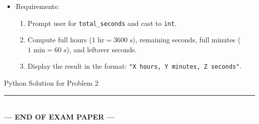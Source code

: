 \documentclass[11pt,a4paper]{article}
\begin{document}
\begin{itemize}[noitemsep]

  \item Requirements:

  \begin{enumerate}[noitemsep]

    \item Prompt user for \texttt{total\_seconds} and cast to \texttt{int}.

    \item Compute full hours ($1\text{ hr} = 3600\text{ s}$), remaining seconds, full minutes ($1\text{ min} = 60\text{ s}$), and leftover seconds.

    \item Display the result in the format: \texttt{"X hours, Y minutes, Z seconds"}.

  \end{enumerate}

\end{itemize}

\begin{answerbox}[height=16.0cm]{Python Solution for Problem 2}

\vspace{0.03cm}

\end{answerbox}

\begin{center}

  \vspace{0.15cm}

  \rule{0.5\textwidth}{0.4pt}\\[0.08cm]

  \textbf{\color{primaryblue}--- END OF EXAM PAPER ---}

\end{center}
\end{document}
